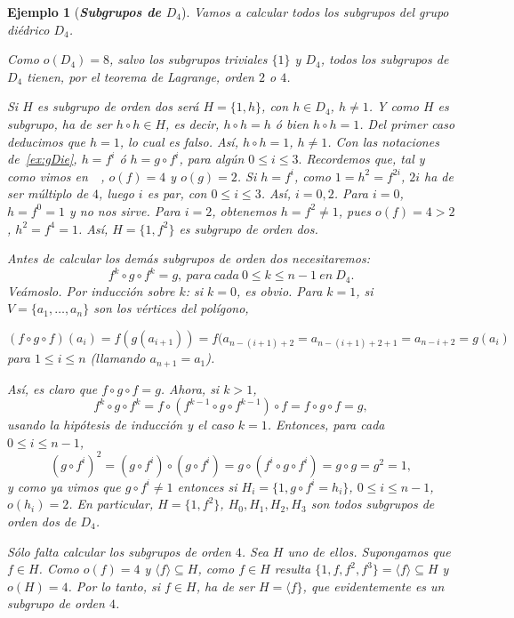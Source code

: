 \documentclass[12pt]{article}
\newtheorem{example}{Ejemplo}[theorem]
\begin{document}
\begin{example} [\textbf{\textit{Subgrupos de $D_4$}}] \label{ex:subDie} Vamos a calcular todos los subgrupos del grupo diédrico $D_4$.

Como $o(D_4) = 8$, salvo los subgrupos triviales $\lbrace 1 \rbrace$ y $D_4$, todos los subgrupos de $D_4$ tienen, por el teorema de Lagrange, orden $2$ o $4$.

Si $H$ es subgrupo de orden dos será $H = \lbrace 1, h \rbrace$, con $h \in D_4$, $h \neq 1$. Y como $H$ es subgrupo, ha de ser $h \circ h \in H$, es decir, $h \circ h = h$ ó bien $h \circ h = 1$. Del primer caso deducimos que $h =1$, lo cual es falso. Así, $h \circ h = 1$, $h \neq 1$. Con las notaciones de~\ref{ex:gDie}, $h = f^i$ ó $h =g \circ f^i$, para algún $0 \leq i \leq 3.$ Recordemos que, tal y como vimos en~~, $o(f) = 4$ y $o(g)=2$. Si $h = f^i$, como $1 = h^2 =f^{2i}$, $2i$ ha de ser múltiplo de $4$, luego $i$ es par, con $0 \leq i \leq 3$. Así, $i = 0,2$. Para $i=0$, $h = f^0 = 1$ y no nos sirve. Para $i = 2$, obtenemos $h = f^2 \neq 1$, pues $o(f) = 4 > 2$, $h^2 = f^4 = 1$. Así, $H = \lbrace 1,f^2 \rbrace$ es subgrupo de orden dos.

Antes de calcular los demás subgrupos de orden dos necesitaremos: $$f^k \circ g \circ f^k = g,~para~cada~0 \leq k \leq n-1~en~D_4.$$
Veámoslo. Por inducción sobre $k$: si $k = 0$, es obvio. Para $k = 1$, si $V = \lbrace a_1, \ldots, a_n \rbrace$ son los vértices del polígono, \begin{center}$(f \circ g \circ f) (a_i) = f(g(a_{i+1})) = f(a_{n-(i+1)+2} = a_{n-(i+1)+2+1} = a_{n-i+2}=g(a_i)$ para $1 \leq i \leq n$ (llamando $a_{n+1} = a_1$). \end{center} Así, es claro que $f\circ g \circ f = g$. Ahora, si $k>1$, $$f^k \circ g \circ f^k = f\circ(f^{k-1} \circ g \circ f^{k-1}) \circ f= f \circ g \circ f = g,$$ usando la hipótesis de inducción y el caso $k = 1$. Entonces, para cada $0 \leq i \leq n-1$, $$(g \circ f^i)^2 = (g \circ f^i) \circ (g \circ f^i) = g \circ (f^i \circ g \circ f^i) = g \circ g = g^2 = 1,$$ y como ya vimos que $g \circ f^i \neq 1$ entonces si $H_i = \lbrace 1, g \circ f^i = h_i \rbrace$, $0 \leq i \leq n-1$, $o(h_i)=2$. En particular, $H = \lbrace 1, f^2 \rbrace$, $H_0, H_1, H_2,H_3$ son todos subgrupos de orden dos de $D_4$.

Sólo falta calcular los subgrupos de orden $4$. Sea $H$ uno de ellos. Supongamos que $f \in H$. Como $o(f) = 4$ y $ \langle f \rangle \subseteq H$, como $f \in H$ resulta $\lbrace 1,f,f^2,f^3 \rbrace = \langle f \rangle \subseteq H$ y $o(H) = 4$. Por lo tanto, si $f \in H$, ha de ser $H = \langle f \rbrace$, que evidentemente es un subgrupo de orden $4$.


\end{example}
\end{document}
